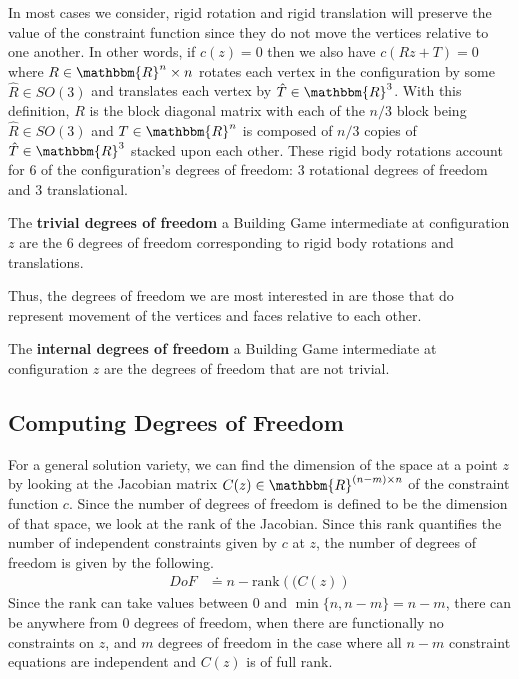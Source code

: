 In most cases we consider, rigid rotation and rigid translation will preserve the value of the constraint function since they do not move the vertices relative to one another. In other words, if $c(z) = 0$ then we also have $c(Rz + T) = 0$ where $R \in \mathbbm{R}^{n}\times n$ rotates each vertex in the configuration by some $\hat{R} \in SO(3)$ and translates each vertex by $\hat{T} \in \mathbbm{R}^3$. With this definition, $R$ is the block diagonal matrix with each of the $n/3$ block being $\hat{R} \in SO(3)$ and $T \in \mathbbm{R}^n$ is composed of $n/3$ copies of $\hat{T} \in \mathbbm{R}^3$ stacked upon each other. These rigid body rotations account for $6$ of the configuration's degrees of freedom: $3$ rotational degrees of freedom and $3$ translational.
\begin{mydef}
The \textbf{trivial degrees of freedom} a Building Game intermediate at configuration $z$ are the $6$ degrees of freedom corresponding to rigid body rotations and translations.
\end{mydef}
Thus, the degrees of freedom we are most interested in are those that do represent movement of the vertices and faces relative to each other. 
\begin{mydef}
The \textbf{internal degrees of freedom} a Building Game intermediate at configuration $z$ are the degrees of freedom that are not trivial.
\end{mydef}

\subsection{Computing Degrees of Freedom}

For a general solution variety, we can find the dimension of the space at a point $z$ by looking at the Jacobian matrix $C(z) \in \mathbbm{R}^{(n-m)\times n}$ of the constraint function $c$. Since the number of degrees of freedom is defined to be the dimension of that space, we look at the rank of the Jacobian. Since this rank quantifies the number of independent constraints given by $c$ at $z$, the number of degrees of freedom is given by the following.
\begin{align}
DoF &\doteq n - \text{rank}\left((C(z)\right)
\end{align}
Since the rank can take values between $0$ and $\min\{n,n-m\} = n-m$, there can be anywhere from $0$ degrees of freedom, when there are functionally no constraints on $z$, and $m$ degrees of freedom in the case where all $n-m$ constraint equations are independent and $C(z)$ is of full rank. 

